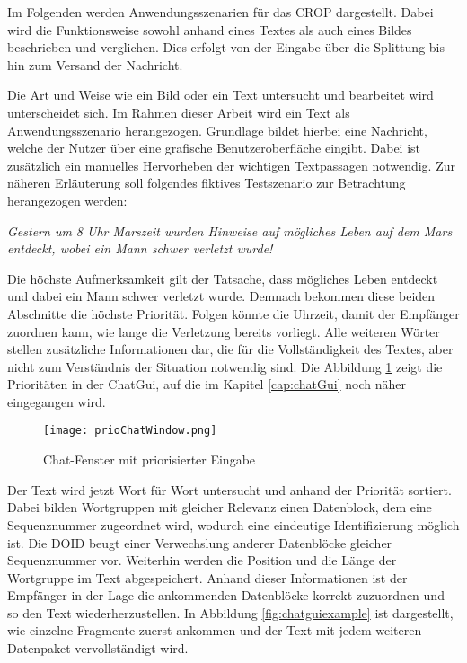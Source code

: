 \label{sec:Anwendungsszenarien}

Im Folgenden werden Anwendungsszenarien für das \gls{CROP} dargestellt. Dabei
wird die Funktionsweise sowohl anhand eines Textes als auch eines Bildes beschrieben und
verglichen. Dies erfolgt von der Eingabe über die Splittung bis hin zum Versand
der Nachricht.

Die Art und Weise wie ein Bild oder ein Text untersucht und bearbeitet wird
unterscheidet sich. Im Rahmen dieser Arbeit wird ein Text als
Anwendungsszenario herangezogen. Grundlage bildet hierbei eine Nachricht,
welche der Nutzer über eine grafische Benutzeroberfläche eingibt.
Dabei ist zusätzlich ein manuelles Hervorheben der wichtigen Textpassagen
notwendig. Zur näheren Erläuterung soll folgendes fiktives Testszenario zur
Betrachtung herangezogen werden:

\textit{\glqq Gestern um 8 Uhr Marszeit wurden Hinweise auf mögliches Leben auf
dem Mars entdeckt, wobei ein Mann schwer verletzt wurde! \grqq}

Die höchste Aufmerksamkeit gilt der Tatsache, dass mögliches Leben entdeckt und
dabei ein Mann schwer verletzt wurde. Demnach bekommen diese beiden Abschnitte
die höchste Priorität. Folgen könnte die Uhrzeit, damit der Empfänger zuordnen
kann, wie lange die Verletzung bereits vorliegt. Alle weiteren Wörter stellen
zusätzliche Informationen dar, die für die Vollständigkeit des Textes, aber
nicht zum Verständnis der Situation notwendig sind. Die Abbildung
\ref{fig:prioChatWindow} zeigt die Prioritäten in der ChatGui, auf die im
Kapitel \ref{cap:chatGui} noch näher eingegangen wird.

\begin{figure}[H]
	\centering
	\texttt{[image: prioChatWindow.png]}
	\label{fig:prioChatWindow}
	\caption{Chat-Fenster mit priorisierter Eingabe}
\end{figure}

Der Text wird jetzt Wort für Wort untersucht und anhand der Priorität sortiert.
Dabei bilden Wortgruppen mit gleicher Relevanz einen Datenblock, dem eine
Sequenznummer zugeordnet wird, wodurch eine eindeutige Identifizierung möglich
ist. Die \gls{DOID} beugt einer Verwechslung anderer Datenblöcke gleicher
Sequenznummer vor. Weiterhin werden die Position und die Länge der Wortgruppe im
Text abgespeichert. Anhand dieser Informationen ist der Empfänger in der Lage
die ankommenden Datenblöcke korrekt zuzuordnen und so den Text
wiederherzustellen.
In Abbildung \ref{fig:chatguiexample} ist dargestellt, wie einzelne Fragmente
zuerst ankommen und der Text mit jedem weiteren Datenpaket vervollständigt wird.


